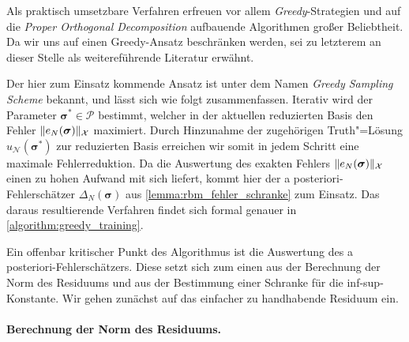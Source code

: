 \documentclass[../main.tex]{subfiles}
\begin{document}
Als praktisch umsetzbare Verfahren erfreuen vor allem \emph{Greedy}-Strategien und auf die \emph{Proper Orthogonal Decomposition} aufbauende Algorithmen großer Beliebtheit.
Da wir uns auf einen Greedy-Ansatz beschränken werden, sei zu letzterem an dieser Stelle \cite{} als weitereführende Literatur erwähnt.

Der hier zum Einsatz kommende Ansatz ist unter dem Namen \emph{Greedy Sampling Scheme} bekannt, und lässt sich wie folgt zusammenfassen.
Iterativ wird der Parameter $\bm \sigma^{*} \in \mathcal P$ bestimmt, welcher in der aktuellen reduzierten Basis den Fehler $\lVert e_{N}(\bm \sigma)\rVert_{\mathcal X}$ maximiert.
Durch Hinzunahme der zugehörigen Truth"=Lösung $u_{\mathcal N}(\bm \sigma^{*})$ zur reduzierten Basis erreichen wir somit in jedem Schritt eine maximale Fehlerreduktion.
Da die Auswertung des exakten Fehlers $\lVert e_{N}(\bm \sigma)\rVert_{\mathcal X}$ einen zu hohen Aufwand mit sich liefert, kommt hier der a posteriori-Fehlerschätzer $\Delta_{N}(\bm \sigma)$ aus \cref{lemma:rbm_fehler_schranke} zum Einsatz.
Das daraus resultierende Verfahren findet sich formal genauer in \cref{algorithm:greedy_training}.

Ein offenbar kritischer Punkt des Algorithmus ist die Auswertung des a posteriori-Fehlerschätzers.
Diese setzt sich zum einen aus der Berechnung der Norm des Residuums und aus der Bestimmung einer Schranke für die inf-sup-Konstante.
Wir gehen zunächst auf das einfacher zu handhabende Residuum ein.

\paragraph{Berechnung der Norm des Residuums.} %
\label{par:berechnung_der_norm_des_residuum}
\end{document}
